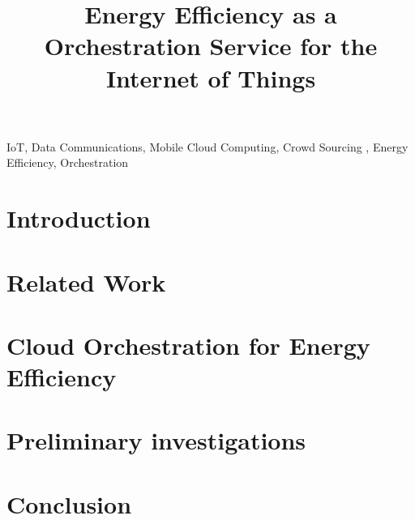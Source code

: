 \documentclass[journal]{IEEEtran}
\begin{document}
\title{Energy Efficiency as a Orchestration Service for the Internet of Things}

\author{
}



\maketitle
\pagestyle{empty}
\thispagestyle{empty}
\begin{abstract}

\end{abstract}

\begin{IEEEkeywords}
IoT, Data Communications, Mobile Cloud Computing, Crowd Sourcing , Energy Efficiency, Orchestration
\end{IEEEkeywords}

\IEEEpeerreviewmaketitle

\section{Introduction}

\section{Related Work}

\section{Cloud Orchestration for Energy Efficiency}

\section{Preliminary investigations}

\section{Conclusion}

\end{document}
